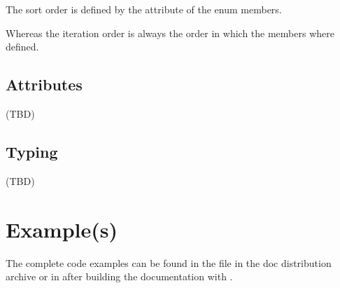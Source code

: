 \documentclass[letterpaper,10pt,english]{sphinxmanual}
\begin{document}
\sphinxAtStartPar
The sort order is defined by the  attribute of the enum
members.
\def\sphinxLiteralBlockLabel{\label{\detokenize{enums:id12}}}
\begin{sphinxVerbatim}[commandchars=\\\{\}]
   
   
\end{sphinxVerbatim}

\sphinxAtStartPar
Whereas the iteration order is always the order in which the members where defined.
\def\sphinxLiteralBlockLabel{\label{\detokenize{enums:id13}}}
\begin{sphinxVerbatim}[commandchars=\\\{\}]
   \PYG{p}{[}
       
\PYG{p}{]}
\end{sphinxVerbatim}


\subsection{Attributes}
\label{\detokenize{enums:attributes}}
\sphinxAtStartPar
(TBD)


\subsection{Typing}
\label{\detokenize{enums:typing}}
\sphinxAtStartPar
(TBD)
\def\sphinxLiteralBlockLabel{\label{\detokenize{enums:id14}}}
\begin{sphinxVerbatim}[commandchars=\\\{\}]
    


\end{sphinxVerbatim}


\section{Example(s)}
\label{\detokenize{enums:example-s}}
\sphinxAtStartPar
The complete code examples can be found in the file 
in the doc distribution archive or in  after
building the documentation with .
\end{document}
